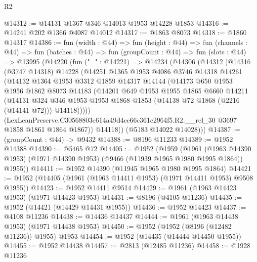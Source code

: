 \begin{lexlean}{R2}
\begin{coremodule}
@14312 := @14131 @1367 @346 @14013 @1953 @14228 @1853
@14316 := @14241 @202 @1366 @4087 @14012
@14317 := @1863 @8073
@14318 := @1860 @14317
@14386 := fun (width : @44) =>
  fun (height : @44) =>
  fun (channels : @44) =>
  fun (batches : @44) =>
  fun (groupCount : @44) =>
  fun (slots : @44) =>
  @13995
    (@14220
      (fun ("_" : @14221) =>
      @14234
        (@14306
          (@14312
            (@14316
              (@3747 @14318)
              @14228
              (@14251
                @1365
                @1953
                @4086
                @3746
                @14318
                @14261
                (@14132
                  @1364
                  @1953
                  @3312
                  @1859
                  @14317
                  @14144
                  (@14173
                    @650
                    @1953
                    @1956
                    @1862
                    @8073
                    @14183
                    (@14201
                      @649
                      @1953
                      @1955
                      @1865
                      @6660
                      @14211
                      (@14131
                        @324
                        @346
                        @1953
                        @1953
                        @1868
                        @1853
                        (@14138 @72 @1868 (@2216 (@14141 @72)))
                        @14118)))))
              (LexLeanPreserve.C30568803e614a49d4ce66c361c2964f5.R2.__rel_30
                @3697
                @1858
                @1861
                @1864
                @1867))
            @14118))
        (@5183 @14022 @14028)))
@14387 := (groupCount : @44) -> @9432
@14388 := @8196 @11233
@14389 := @1952 @14388
@14390 := @5465 @72
@14405 := @1952
    (@1959
      (@1961
        (@1963 @14390 @1953)
        (@1971 @14390 @1953)
        (@9466 (@11939 @1965 @1980 @1995 @1864))
        @1955))
@14411 := @1952 @14390 (@11945 @1965 @1980 @1995 @1864)
@14421 := @1952 (@14405 (@1961 (@1963 @14411 @1953) (@1971 @14411 @1953) @9508 @1955))
@14423 := @1952 @14411 @9514
@14429 := @1961 (@1963 @14423 @1953) (@1971 @14423 @1953)
@14431 := @8196 (@4105 @11236)
@14435 := @1952 (@14421 (@14429 @14431 @1955))
@14436 := @1952 @14423
@14437 := @4108 @11236
@14438 := @14436 @14437
@14444 := @1961 (@1963 @14438 @1953) (@1971 @14438 @1953)
@14450 := @1952 (@1952 (@8196 (@12482 @11236)) @1955) @1953
@14454 := @1952 (@14435 (@14444 @14450 @1955))
@14455 := @1952 @14438
@14457 := @2813 (@12485 @11236)
@14458 := @1928 @11236

\end{coremodule}
\end{lexlean}
